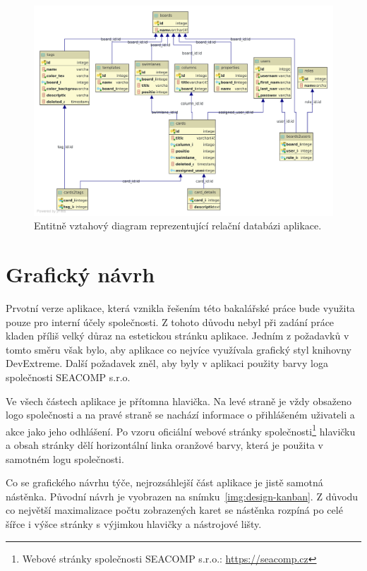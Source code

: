 \begin{figure}[H]
	\centering
	\label{img:erd}
	\includegraphics[width=\textwidth]{obrazky-figures/erd.pdf}
	\caption{Entitně vztahový diagram reprezentující relační databázi aplikace.}
\end{figure}


\section{Grafický návrh}
Prvotní verze aplikace, která vznikla řešením této bakalářské práce bude využita pouze pro interní účely společnosti. Z tohoto důvodu nebyl při zadání práce kladen příliš velký důraz na estetickou stránku aplikace. Jedním z požadavků v tomto směru však bylo, aby aplikace co nejvíce využívala grafický styl knihovny DevExtreme. Další požadavek zněl, aby byly v aplikaci použity barvy loga společnosti SEACOMP s.r.o.

Ve všech částech aplikace je přítomna hlavička. Na levé straně je vždy obsaženo logo společnosti a na pravé straně se nachází informace o přihlášeném uživateli a akce jako jeho odhlášení. Po vzoru oficiální webové stránky společnosti\footnote{Webové stránky společnosti SEACOMP s.r.o.: \url{https://seacomp.cz}} hlavičku a obsah stránky dělí horizontální linka oranžové barvy, která je použita v samotném logu společnosti.

Co se grafického návrhu týče, nejrozsáhlejší část aplikace je jistě samotná nástěnka. Původní návrh je vyobrazen na snímku~\ref{img:design-kanban}. Z důvodu co největší maximalizace počtu zobrazených karet se nástěnka rozpíná po celé šířce i výšce stránky s výjimkou hlavičky a nástrojové lišty.

